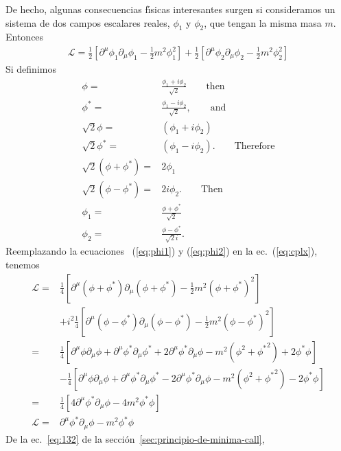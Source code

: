 De hecho, algunas consecuencias f\'\i sicas interesantes surgen si consideramos un sistema de dos campos escalares reales, $\phi_1$ y $\phi_2$, que tengan la misma masa $m$. Entonces
\begin{align}
  \label{eq:cplx}
  \mathcal{L}=\frac{1}{2}[\partial^\mu\phi_1\partial_\mu\phi_1-\frac{1}{2}m^2\phi_1^2]+\frac{1}{2}[\partial^\mu\phi_2\partial_\mu\phi_2-\frac{1}{2}m^2\phi_2^2]
\end{align}                                                     
Si definimos
\begin{align}
  \label{eq:cplx_trans}
    \phi=&\frac{\phi_1+i\phi_2}{\sqrt{2}}\qquad\text{then}\\
    \phi^*=&\frac{\phi_1-i\phi_2}{\sqrt{2}},\qquad\text{and}\\
    \sqrt{2}\phi=&(\phi_1+i\phi_2)\nonumber\\
    \sqrt{2}\phi^*=&(\phi_1-i\phi_2).\qquad\text{Therefore}\nonumber\\
    \sqrt{2}(\phi+\phi^*)=&2\phi_1\nonumber\\
    \sqrt{2}(\phi-\phi^*)=&2i\phi_2.\qquad\text{Then}\nonumber\\
    \phi_1=&\frac{\phi+\phi^*}{\sqrt{2}}\label{eq:phi1}\\
    \phi_2=&\frac{\phi-\phi^*}{\sqrt{2}i}\label{eq:phi2}. %
\end{align}
Reemplazando la ecuaciones ~(\ref{eq:phi1})
y (\ref{eq:phi2}) %
en la ec.~(\ref{eq:cplx}), tenemos
\begin{align}
  \mathcal{L}=&\frac{1}{4}[\partial^\mu(\phi+\phi^*)\partial_\mu(\phi+\phi^*)-\frac{1}{2}m^2(\phi+\phi^*)^2]\nonumber\\
 & +i^2\frac{1}{4}[\partial^\mu(\phi-\phi^*)\partial_\mu(\phi-\phi^*)-\frac{1}{2}m^2(\phi-\phi^*)^2]\nonumber\\
 =&\frac{1}{4}[\partial^\mu\phi\partial_\mu\phi+\partial^\mu\phi^*\partial_\mu\phi^*+2\partial^\mu\phi^*\partial_\mu\phi-m^2(\phi^2+{\phi^*}^2)+2\phi^*\phi]\nonumber\\
   &-\frac{1}{4}[\partial^\mu\phi\partial_\mu\phi+\partial^\mu\phi^*\partial_\mu\phi^*-2\partial^\mu\phi^*\partial_\mu\phi-m^2(\phi^2+{\phi^*}^2)-2\phi^*\phi]\nonumber\\
 =&\frac{1}{4}[4\partial^\mu\phi^*\partial_\mu\phi-4m^2\phi^*\phi]\nonumber\\
 \label{eq:41}
\mathcal{L}=&\partial^\mu\phi^*\partial_\mu\phi-m^2\phi^*\phi
\end{align}
De la ec.~\eqref{eq:132} de la secci\'on~\ref{sec:principio-de-minima-call}, 

